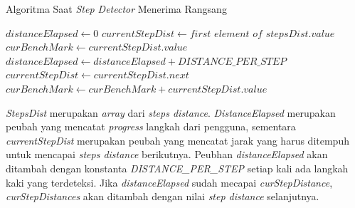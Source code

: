 \begin{algorithm}
	\caption{Algoritma Saat \textit{Step Detector} Menerima Rangsang}
	\label{alg:algoritma-step-detector}
	\begin{algorithmic}[1]
		\State $distanceElapsed \gets 0$ 
		\State $currentStepDist \gets first$ $element$ $of$ $stepsDist.value$
		\State $curBenchMark \gets currentStepDist.value$
    		\State $distanceElapsed \gets distanceElapsed + DISTANCE\_PER\_STEP$
    			\State $currentStepDist \gets currentStepDist.next$    			
				\State $curBenchMark \gets curBenchMark + currentStepDist.value$
				
    			\EndIf
    		\EndIf
    	\EndIf
	\EndFunction  
	\end{algorithmic}
\end{algorithm}

\textit{StepsDist} merupakan \textit{array} dari \textit{steps distance}. \textit{DistanceElapsed} merupakan peubah yang mencatat \textit{progress} langkah dari pengguna, sementara \textit{currentStepDist} merupakan peubah yang mencatat jarak yang harus ditempuh untuk mencapai \textit{steps distance} berikutnya.
Peubhan \textit{distanceElapsed} akan ditambah dengan konstanta \textit{DISTANCE\_PER\_STEP} setiap kali ada langkah kaki yang terdeteksi.
Jika \textit{distanceElapsed} sudah mecapai \textit{curStepDistance}, \textit{curStepDistances} akan ditambah dengan nilai \textit{step distance} selanjutnya. 